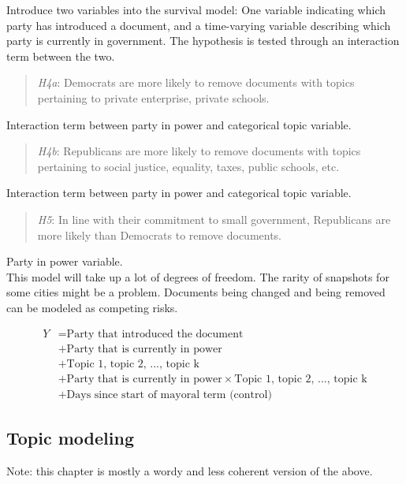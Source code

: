 \documentclass[11pt]{article}
\begin{document}
Introduce two variables into the survival model: One variable indicating which party has introduced a document, and a time-varying variable describing which party is currently in government. The hypothesis is tested through an interaction term between the two.

\begin{quote}
\textit{H4a}: Democrats are more likely to remove documents with topics pertaining to private enterprise, private schools.
\end{quote}

Interaction term between party in power and categorical topic variable.

\begin{quote}
\textit{H4b}: Republicans are more likely to remove documents with topics pertaining to social justice, equality, taxes, public schools, etc.
\end{quote}

Interaction term between party in power and categorical topic variable.

\begin{quote}
\textit{H5}: In line with their commitment to small government, Republicans are more likely than Democrats to remove documents.
\end{quote}

Party in power variable.\\


This model will take up a lot of degrees of freedom. The rarity of snapshots for some cities might be a problem. Documents being changed and being removed can be modeled as competing risks.


\begin{equation} 
\label{eq1}
\begin{split}
Y & = \text{Party that introduced the document} \\
 & + \text{Party that is currently in power} \\
 & + \text{Topic 1, topic 2, ..., topic k} \\
 & + \text{Party that is currently in power} \times \text{Topic 1, topic 2, ..., topic k} \\
 & + \text{Days since start of mayoral term (control)}
\end{split}
\end{equation}

\subsection{Topic modeling}
Note: this chapter is mostly a wordy and less coherent version of the above.
\end{document}
